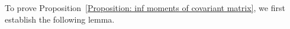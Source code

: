 \documentclass{article}
\newtheorem{lemma}      [theorem]{Lemma}
\theoremstyle{definition}
\newcommand{\NC}{\mathcal{NC}}
\begin{document}
{To prove Proposition~\ref{Proposition: inf moments of covariant matrix}, we first
establish the following lemma.
}
\end{document}
